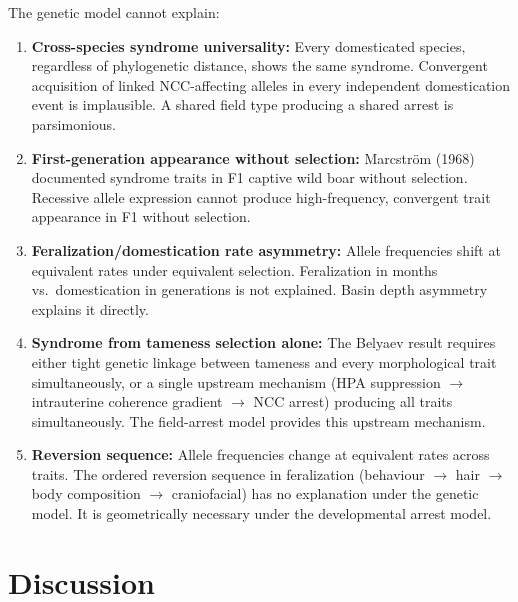 \documentclass[11pt, a4paper]{article}
\begin{document}
The genetic model cannot explain:

\begin{enumerate}[itemsep=0.2em]
  \item \textbf{Cross-species syndrome universality:}
    Every domesticated species, regardless of
    phylogenetic distance, shows the same syndrome.
    Convergent acquisition of linked NCC-affecting
    alleles in every independent domestication event
    is implausible. A shared field type producing
    a shared arrest is parsimonious.

  \item \textbf{First-generation appearance without
    selection:} Marcstr\"{o}m (1968) documented
    syndrome traits in F1 captive wild boar without
    selection. Recessive allele expression cannot
    produce high-frequency, convergent trait
    appearance in F1 without selection.

  \item \textbf{Feralization/domestication rate
    asymmetry:} Allele frequencies shift at
    equivalent rates under equivalent selection.
    Feralization in months vs.\ domestication in
    generations is not explained. Basin depth
    asymmetry explains it directly.

  \item \textbf{Syndrome from tameness selection
    alone:} The Belyaev result requires either
    tight genetic linkage between tameness and
    every morphological trait simultaneously, or
    a single upstream mechanism (HPA suppression
    $\rightarrow$ intrauterine coherence gradient
    $\rightarrow$ NCC arrest) producing all traits
    simultaneously. The field-arrest model provides
    this upstream mechanism.

  \item \textbf{Reversion sequence:} Allele
    frequencies change at equivalent rates across
    traits. The ordered reversion sequence in
    feralization (behaviour $\to$ hair $\to$ body
    composition $\to$ craniofacial) has no explanation
    under the genetic model. It is geometrically
    necessary under the developmental arrest model.
\end{enumerate}

\section{Discussion}
\label{sec:discussion}
\end{document}
